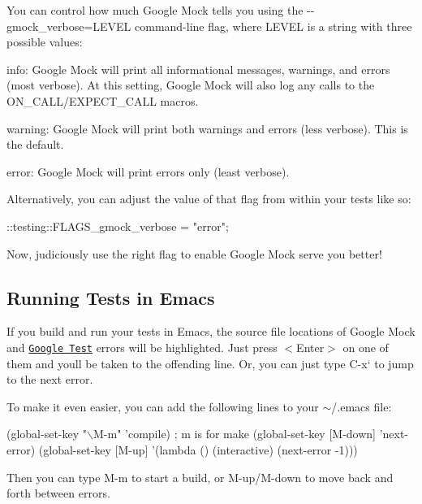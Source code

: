 You can control how much Google Mock tells you using the {\ttfamily -\/-\/gmock\+\_\+verbose=L\+E\+V\+EL} command-\/line flag, where {\ttfamily L\+E\+V\+EL} is a string with three possible values\+:


\begin{DoxyItemize}
\item {\ttfamily info}\+: Google Mock will print all informational messages, warnings, and errors (most verbose). At this setting, Google Mock will also log any calls to the {\ttfamily O\+N\+\_\+\+C\+A\+L\+L/\+E\+X\+P\+E\+C\+T\+\_\+\+C\+A\+LL} macros.
\item {\ttfamily warning}\+: Google Mock will print both warnings and errors (less verbose). This is the default.
\item {\ttfamily error}\+: Google Mock will print errors only (least verbose).
\end{DoxyItemize}

Alternatively, you can adjust the value of that flag from within your tests like so\+:


\begin{DoxyCode}
::testing::FLAGS\_gmock\_verbose = "error";
\end{DoxyCode}


Now, judiciously use the right flag to enable Google Mock serve you better!

\subsection*{Running Tests in Emacs}

If you build and run your tests in Emacs, the source file locations of Google Mock and \href{http://code.google.com/p/googletest/}{\tt Google Test} errors will be highlighted. Just press {\ttfamily $<$Enter$>$} on one of them and you\textquotesingle{}ll be taken to the offending line. Or, you can just type {\ttfamily C-\/x}` to jump to the next error.

To make it even easier, you can add the following lines to your {\ttfamily $\sim$/.emacs} file\+:


\begin{DoxyCode}
(global-set-key "\(\backslash\)M-m"   'compile)  ; m is for make
(global-set-key [M-down] 'next-error)
(global-set-key [M-up]   '(lambda () (interactive) (next-error -1)))
\end{DoxyCode}


Then you can type {\ttfamily M-\/m} to start a build, or {\ttfamily M-\/up}/{\ttfamily M-\/down} to move back and forth between errors.

